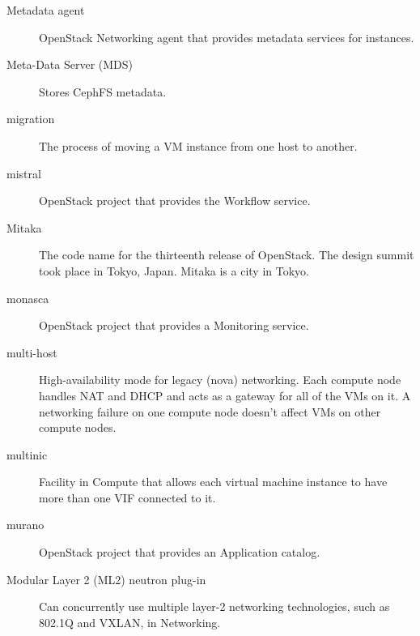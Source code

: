 \documentclass[letterpaper,10pt,english]{sphinxmanual}
\begin{document}
\begin{description}
\item[{Metadata agent}] \leavevmode{}\label{_source/glossary:term-metadata-agent}
OpenStack Networking agent that provides metadata
services for instances.

\item[{Meta-Data Server (MDS)}] \leavevmode{}\label{_source/glossary:term-meta-data-server-mds}
Stores CephFS metadata.

\item[{migration}] \leavevmode{}\label{_source/glossary:term-migration}
The process of moving a VM instance from one host to
another.

\item[{mistral}] \leavevmode{}\label{_source/glossary:term-mistral}
OpenStack project that provides the Workflow service.

\item[{Mitaka}] \leavevmode{}\label{_source/glossary:term-mitaka}
The code name for the thirteenth release of OpenStack.
The design summit took place in Tokyo, Japan. Mitaka
is a city in Tokyo.

\item[{monasca}] \leavevmode{}\label{_source/glossary:term-monasca}
OpenStack project that provides a Monitoring service.

\item[{multi-host}] \leavevmode{}\label{_source/glossary:term-multi-host}
High-availability mode for legacy (nova) networking.
Each compute node handles NAT and DHCP and acts as a gateway
for all of the VMs on it. A networking failure on one compute
node doesn't affect VMs on other compute nodes.

\item[{multinic}] \leavevmode{}\label{_source/glossary:term-multinic}
Facility in Compute that allows each virtual machine instance to
have more than one VIF connected to it.

\item[{murano}] \leavevmode{}\label{_source/glossary:term-murano}
OpenStack project that provides an Application catalog.

\item[{Modular Layer 2 (ML2) neutron plug-in}] \leavevmode{}\label{_source/glossary:term-modular-layer-2-ml2-neutron-plug-in}
Can concurrently use multiple layer-2 networking technologies,
such as 802.1Q and VXLAN, in Networking.


\end{description}
\end{document}
